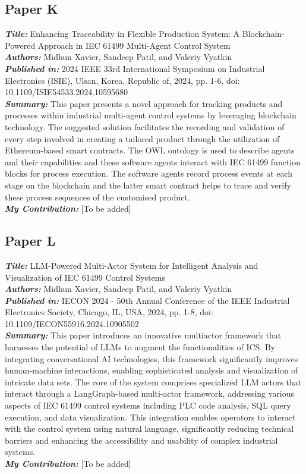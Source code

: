 \subsection{Paper K}
\textbf{\textit{Title:}} Enhancing Traceability in Flexible Production System: A Blockchain-Powered Approach in IEC 61499 Multi-Agent Control System\\
\textbf{\textit{Authors:}} Midhun Xavier, Sandeep Patil, and Valeriy Vyatkin\\
\textbf{\textit{Published in:}} 2024 IEEE 33rd International Symposium on Industrial Electronics (ISIE), Ulsan, Korea, Republic of, 2024, pp. 1-6, doi: 10.1109/ISIE54533.2024.10595680\\
\textbf{\textit{Summary:}} This paper presents a novel approach for tracking products and processes within industrial multi-agent control systems by leveraging blockchain technology. The suggested solution facilitates the recording and validation of every step involved in creating a tailored product through the utilization of Ethereum-based smart contracts. The OWL ontology is used to describe agents and their capabilities and these software agents interact with IEC 61499 function blocks for process execution. The software agents record process events at each stage on the blockchain and the latter smart contract helps to trace and verify these process sequences of the customised product.\\
\textbf{\textit{My Contribution:}} [To be added]

\subsection{Paper L}
\textbf{\textit{Title:}} LLM-Powered Multi-Actor System for Intelligent Analysis and Visualization of IEC 61499 Control Systems\\
\textbf{\textit{Authors:}} Midhun Xavier, Sandeep Patil, and Valeriy Vyatkin\\
\textbf{\textit{Published in:}} IECON 2024 - 50th Annual Conference of the IEEE Industrial Electronics Society, Chicago, IL, USA, 2024, pp. 1-8, doi: 10.1109/IECON55916.2024.10905502\\
\textbf{\textit{Summary:}} This paper introduces an innovative multiactor framework that harnesses the potential of LLMs to augment the functionalities of ICS. By integrating conversational AI technologies, this framework significantly improves human-machine interactions, enabling sophisticated analysis and visualization of intricate data sets. The core of the system comprises specialized LLM actors that interact through a LangGraph-based multi-actor framework, addressing various aspects of IEC 61499 control systems including PLC code analysis, SQL query execution, and data visualization. This integration enables operators to interact with the control system using natural language, significantly reducing technical barriers and enhancing the accessibility and usability of complex industrial systems.\\
\textbf{\textit{My Contribution:}} [To be added]

